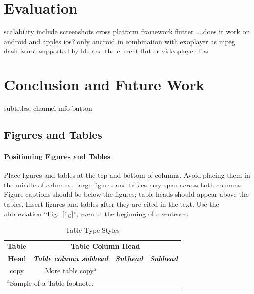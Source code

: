 \documentclass[conference]{IEEEtran}
\begin{document}
\section{Evaluation}

scalability
include screenshots cross platform framework flutter ....does it work on android and apples ios?
only android in combination with exoplayer as mpeg dash is not supported by hls and the current flutter videoplayer libs

\section{Conclusion and Future Work}

subtitles, channel info button



\subsection{Figures and Tables}
\paragraph{Positioning Figures and Tables} Place figures and tables at the top and 
bottom of columns. Avoid placing them in the middle of columns. Large 
figures and tables may span across both columns. Figure captions should be 
below the figures; table heads should appear above the tables. Insert 
figures and tables after they are cited in the text. Use the abbreviation 
``Fig.~\ref{fig}'', even at the beginning of a sentence.

\begin{table}[htbp]
\caption{Table Type Styles}
\begin{center}
\begin{tabular}{|c|c|c|c|}
\hline
\textbf{Table}&\multicolumn{3}{|c|}{\textbf{Table Column Head}} \\
\cline{2-4} 
\textbf{Head} & \textbf{\textit{Table column subhead}}& \textbf{\textit{Subhead}}& \textbf{\textit{Subhead}} \\
\hline
copy& More table copy$^{\mathrm{a}}$& &  \\
\hline
\multicolumn{4}{l}{$^{\mathrm{a}}$Sample of a Table footnote.}
\end{tabular}
\label{tab1}
\end{center}
\end{table}
\end{document}
